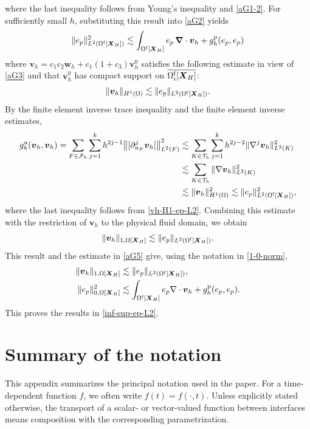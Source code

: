 \documentclass[11pt,reqno]{amsart}
\theoremstyle{definition}
\theoremstyle{plain}
\numberwithin{theorem}{section}
\numberwithin{proposition}{section}
\numberwithin{lemma}{section}
\numberwithin{equation}{section}
\newcommand{\bs}[1]{\boldsymbol{#1}}
\newcommand{\uu}[1]  {{\bs{#1}} }
\newcommand{\grad}   { \uu{\nabla}    }
\newcommand{\bw}{{\bs w}}
\renewcommand{\(}{\bigl(}
\renewcommand{\)}{\bigr)}
\begin{document}
where the last inequality follows from Young's inequality and \eqref{aG1-2}. 
For sufficiently small $h$, substituting this result into \eqref{aG2} yields 
\begin{equation}\label{aG5}
\|e_p\|^2_{L^2(\Omega^{\rm f}[{\bs X}_H])} 
\lesssim \int_{\Omega^{\rm f}[{\bs X}_H]} e_p \,\grad\cdot {\bs v}_h
+ g_h^{\rm p}(e_p,e_p) 
\end{equation}
where ${\bs v}_h = c_1c_2 \bw_h + c_1(1+c_3){\bs v}_h^0 $ satisfies the following estimate in view of \eqref{aG3} and that ${\bs v}_h^0$ has compact support on $\overline{\Omega^{\rm f}_i[{\bs X}_H]}$: 
\begin{align}\label{vh-H1-ep-L2}
\|{\bs v}_h\|_{H^1(\Omega)}
\lesssim
\|e_p\|_{L^2(\Omega^{\rm f}[{\bs X}_H])}  .
\end{align}
By the finite element inverse trace inequality and the finite element inverse estimates,
\begin{align*}
g_h^{\rm u}({\bs v}_h,{\bs v}_h)
=
\sum_{F\in\mathcal F_h}
\sum_{j=1}^k
h^{2j-1}
\bigl\|
[\partial_{n_F}^j{\bs v}_h]
\bigr\|_{L^2(F)}^2
&\lesssim
\sum_{K\in\mathcal T_h}
\sum_{j=1}^k
h^{2j-2}
\|\nabla^j{\bs v}_h\|_{L^2(K)}^2
\\
&\lesssim
\sum_{K\in\mathcal T_h}
\|\nabla {\bs v}_h\|_{L^2(K)}^2\\
&\lesssim
\|{\bs v}_h\|_{H^1(\Omega)}^2
\lesssim \|e_p\|_{L^2(\Omega^{\rm f}[{\bs X}_H])}^2 ,
\end{align*}
where the last inequality follows from \eqref{vh-H1-ep-L2}. Combining this estimate with the restriction of ${\bs v}_h$ to the physical fluid domain, we obtain 
\[
\|{\bs v}_h\|_{1,\Omega[{\bs X}_H]}
\lesssim
\|e_p\|_{L^2(\Omega^{\rm f}[{\bs X}_H])} .
\]
This result and the estimate in \eqref{aG5} give, using the notation in \eqref{1-0-norm}, 
\begin{align*}
\|{\bs v}_h\|_{1,\Omega[{\bs X}_H]}
&\lesssim
\|e_p\|_{L^2(\Omega^{\rm f}[{\bs X}_H])},
\\
\|e_p\|_{0,\Omega[{\bs X}_H]}^2
&\lesssim
\int_{\Omega^{\rm f}[{\bs X}_H]}
e_p\nabla\cdot {\bs v}_h
+
g_h^{\rm p}(e_p,e_p).
\end{align*}
This proves the results in \eqref{inf-sup-ep-L2}. 


\section{Summary of the notation}
\label{appendix:notation-summary}

This appendix summarizes the principal notation used in the paper. For a time-dependent function $f$, we often write $f(t)=f(\cdot,t)$. Unless explicitly stated otherwise, the transport of a scalar- or vector-valued function between interfaces means composition with the corresponding parametrization.
\end{document}
